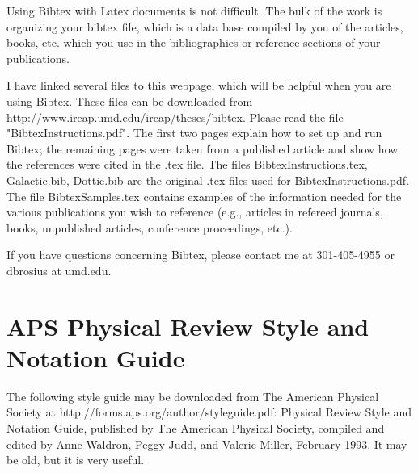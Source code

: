 Using Bibtex with Latex documents is not difficult.  The bulk of the work is organizing your bibtex file, which is a data base compiled by you of the articles, books, etc. which you use in the bibliographies or reference sections of your publications.

I have linked several files to this webpage, which will be helpful when you are using Bibtex.  These files can be downloaded from http://www.ireap.umd.edu/ireap/theses/bibtex.  Please read the file "BibtexInstructions.pdf".  The first two pages explain how to set up and run Bibtex; the remaining pages were taken from a published article and show how the references were cited in the .tex file.   The files BibtexInstructions.tex, Galactic.bib, Dottie.bib are the original .tex files used for BibtexInstructions.pdf.  The file BibtexSamples.tex contains examples of the information needed for the various publications you wish to reference (e.g., articles in refereed journals, books, unpublished articles, conference proceedings, etc.).

If you have questions concerning Bibtex, please contact me at 301-405-4955 or dbrosius at umd.edu.


\section{APS Physical Review Style and Notation Guide}

The following style guide may be downloaded from The American Physical Society at http://forms.aps.org/author/styleguide.pdf:  Physical Review Style and Notation Guide, published by The American Physical Society, compiled and edited by Anne Waldron, Peggy Judd, and Valerie Miller, February 1993.  It may be old, but it is very useful.
